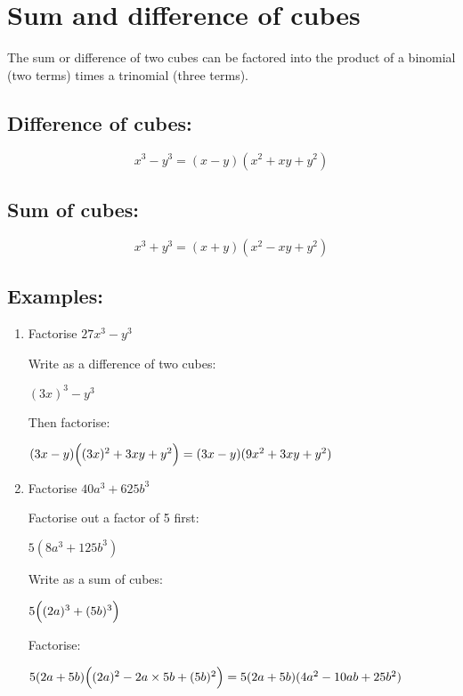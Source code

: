 \documentclass[../main.tex]{subfiles}
\begin{document}
\section{Sum and difference of cubes}
The sum or difference of two cubes can be factored into the product of a binomial (two terms) times a trinomial (three terms).

\subsection*{Difference of cubes:}
\[x^3-y^3=(x-y)(x^2+xy+y^2)\]

\subsection*{Sum of cubes:}
\[x^3+y^3=(x+y)(x^2-xy+y^2)\]

\subsection*{Examples:}
\begin{enumerate}[itemsep=1cm]
    \item 
    Factorise $27x^3-y^3$

    Write as a difference of two cubes:

    $(3x)^3-y^3$

    Then factorise:

    $(3x-y)\Bigl((3x)^2+3xy+y^2\Bigr)=(3x-y)(9x^2+3xy+y^2)$

    \item 
    Factorise $40a^3+625b^3$

    Factorise out a factor of 5 first:

    $5(8a^3+125b^3)$

    Write as a sum of cubes:

    $5\Bigl((2a)^3+(5b)^3\Bigr)$

    Factorise:

    $5(2a+5b)\Bigl((2a)^2-2a\times5b+(5b)^2\Bigr)=5(2a+5b)(4a^2-10ab+25b^2)$
\end{enumerate}
\end{document}

